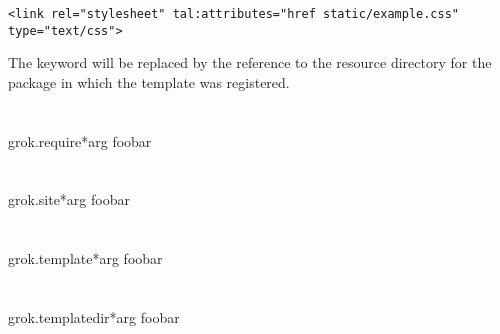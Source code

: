             \begin{verbatim}
<link rel="stylesheet" tal:attributes="href static/example.css" type="text/css">
            \end{verbatim}

            The keyword  will be replaced by the reference to
            the resource directory for the package in which the template was
            registered.

    \section{}

        \begin{funcdesc}{grok.require}{*arg}
        foobar
        \end{funcdesc}

    \section{}

        \begin{funcdesc}{grok.site}{*arg}
        foobar
        \end{funcdesc}

    \section{}

        \begin{funcdesc}{grok.template}{*arg}
        foobar
        \end{funcdesc}

    \section{}

        \begin{funcdesc}{grok.templatedir}{*arg}
        foobar
        \end{funcdesc}
